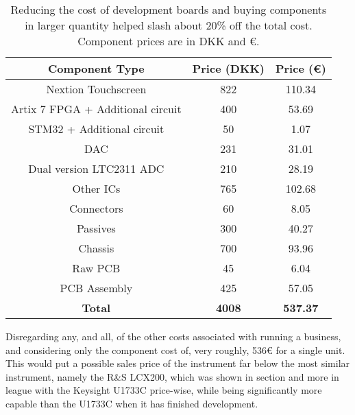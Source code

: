 \begin{table}[H]
    \centering
    \renewcommand{\arraystretch}{1.5}
    \setlength{\tabcolsep}{8pt}
    \begin{tabular}{|c|c|c|}
    \hline
    \textbf{Component Type} & \textbf{Price (DKK)} & \textbf{Price (€)} \\ \hline
    Nextion Touchscreen & 822 & 110.34 \\ \hline
    Artix 7 FPGA + Additional circuit & 400 & 53.69 \\ \hline
    STM32 + Additional circuit & 50 & 1.07 \\ \hline
    DAC & 231 & 31.01 \\ \hline
    Dual version LTC2311 ADC & 210 & 28.19 \\ \hline
    Other ICs & 765 & 102.68 \\ \hline
    Connectors & 60 & 8.05 \\ \hline
    Passives & 300 & 40.27 \\ \hline
    Chassis & 700 & 93.96 \\ \hline
    Raw PCB & 45 & 6.04 \\ \hline
    PCB Assembly & 425 & 57.05 \\ \hline
    \textbf{Total} & \textbf{4008} & \textbf{537.37} \\ \hline
    \end{tabular}
    \caption{Reducing the cost of development boards and buying components in larger quantity helped slash about 20\% off the total cost. Component prices are in DKK and €.}
    \label{tab:ComponentTypeAndPrice2}
\end{table}

Disregarding any, and all, of the other costs associated with running a business, and considering only the component cost of, very roughly, 536€ for a single unit. This would put a possible sales price of the instrument far below the most similar instrument, namely the R\&S LCX200, which was shown in section  and more in league with the Keysight U1733C price-wise, while being significantly more capable than the U1733C when it has finished development.
